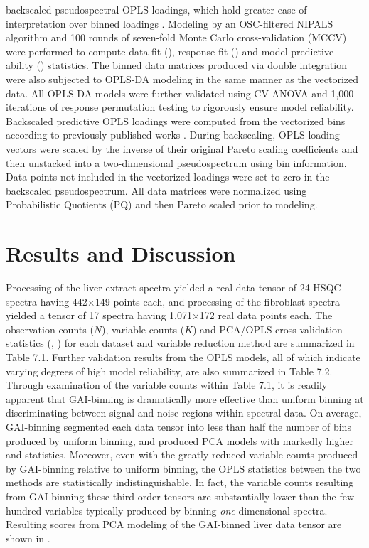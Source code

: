 \begin{doublespace}
backscaled pseudospectral OPLS loadings, which hold greater ease of
interpretation over binned loadings \cite{wiklund:anchem2008}.
Modeling by an OSC-filtered NIPALS algorithm
\cite{trygg:jchemo2002} and 100 rounds of seven-fold Monte Carlo
cross-validation (MCCV) \cite{xu:jchemo2004} were performed to
compute data fit (\rsqx{}), response fit (\rsqy{}) and model predictive ability
(\qsq{}) statistics. The binned data matrices produced via double integration
were also subjected to OPLS-DA modeling in the same manner as the vectorized
data. All OPLS-DA models were further validated using CV-ANOVA
\cite{eriksson:jchemo2008} and 1,000 iterations of response
permutation testing \cite{westerhuis:metab2008a} to rigorously ensure
model reliability. Backscaled predictive OPLS loadings were computed from the
vectorized bins according to previously published works
\cite{cloarec:anchem2005a,hedenstrom:cils2008}. During backscaling,
OPLS loading vectors were scaled by the inverse of their original Pareto
scaling coefficients and then unstacked into a two-dimensional pseudospectrum
using bin information. Data points not included in the vectorized loadings were
set to zero in the backscaled pseudospectrum. All data matrices were normalized
using Probabilistic Quotients (PQ) \cite{dieterle:anchem2006} and then
Pareto scaled \cite{vandenberg:bmcg2006} prior to modeling.
\end{doublespace}

\section{Results and Discussion}

\begin{doublespace}
Processing of the liver extract spectra yielded a real data tensor of 24
\hcnmr{} HSQC spectra having 442$\times$149 points each, and processing of the
fibroblast spectra yielded a tensor of 17 spectra having 1,071$\times$172
real data points each. The observation counts ($N$), variable counts ($K$)
and PCA/OPLS cross-validation statistics (\rsq{}, \qsq{}) for each dataset and
variable reduction method are summarized in Table 7.1. Further validation
results from the OPLS models, all of which indicate varying degrees of high
model reliability, are also summarized in Table 7.2. Through examination of the
variable counts within Table 7.1, it is readily apparent that GAI-binning is
dramatically more effective than uniform binning at discriminating between
signal and noise regions within spectral data. On average, GAI-binning
segmented each data tensor into less than half the number of bins produced by
uniform binning, and produced PCA models with markedly higher \rsqx{} and
\qsq{} statistics. Moreover, even with the greatly reduced variable counts
produced by GAI-binning relative to uniform binning, the OPLS \qsq{} statistics
between the two methods are statistically indistinguishable. In fact, the
variable counts resulting from GAI-binning these third-order tensors are
substantially lower than the few hundred variables typically produced by
binning {\it one}-dimensional spectra. Resulting scores from PCA modeling
of the GAI-binned liver data tensor are shown in .
\end{doublespace}

